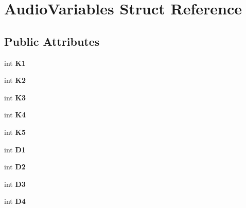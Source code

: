 \hypertarget{struct_audio_variables}{\section{Audio\-Variables Struct Reference}
\label{struct_audio_variables}
}
\subsection*{Public Attributes}
\begin{DoxyCompactItemize}
\item 
\hypertarget{struct_audio_variables_ad31c92d12433269f2e624e891fa16860}{int {\bfseries K1}}\label{struct_audio_variables_ad31c92d12433269f2e624e891fa16860}

\item 
\hypertarget{struct_audio_variables_a2a88b0c4ccb8ae660acf8b40007b3b6f}{int {\bfseries K2}}\label{struct_audio_variables_a2a88b0c4ccb8ae660acf8b40007b3b6f}

\item 
\hypertarget{struct_audio_variables_ad10b9136e6c185d9df8184a3266b2f9e}{int {\bfseries K3}}\label{struct_audio_variables_ad10b9136e6c185d9df8184a3266b2f9e}

\item 
\hypertarget{struct_audio_variables_a8c585051f60d4ad7ad3ab3f29a83f4ad}{int {\bfseries K4}}\label{struct_audio_variables_a8c585051f60d4ad7ad3ab3f29a83f4ad}

\item 
\hypertarget{struct_audio_variables_a68fc9b3c3ad5386a141341ae8c408796}{int {\bfseries K5}}\label{struct_audio_variables_a68fc9b3c3ad5386a141341ae8c408796}

\item 
\hypertarget{struct_audio_variables_a7e69ac2e1572bc4cc99e9db7da30e940}{int {\bfseries D1}}\label{struct_audio_variables_a7e69ac2e1572bc4cc99e9db7da30e940}

\item 
\hypertarget{struct_audio_variables_aa8421d20ce1d969e9c350953f16ef037}{int {\bfseries D2}}\label{struct_audio_variables_aa8421d20ce1d969e9c350953f16ef037}

\item 
\hypertarget{struct_audio_variables_a5c1918b645b70bbb21257d73d918e098}{int {\bfseries D3}}\label{struct_audio_variables_a5c1918b645b70bbb21257d73d918e098}

\item 
\hypertarget{struct_audio_variables_a0bb6d88248bf70c611364ad575a3ee28}{int {\bfseries D4}}\label{struct_audio_variables_a0bb6d88248bf70c611364ad575a3ee28}


\end{DoxyCompactItemize}
